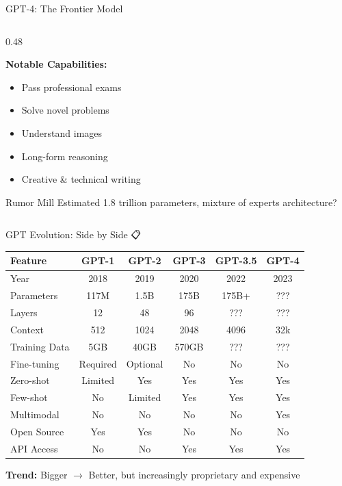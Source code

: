 \documentclass[aspectratio=169]{beamer}
\begin{document}
\begin{frame}{GPT-4: The Frontier Model 🔮}
\begin{columns}[T]
\begin{column}{0.48\textwidth}
\vspace{0.5em}

\textbf{Notable Capabilities:}
\begin{itemize}
    \item Pass professional exams
    \item Solve novel problems
    \item Understand images
    \item Long-form reasoning
    \item Creative \& technical writing
\end{itemize}

\vspace{0.5em}

\begin{alertblock}{Rumor Mill}
\scriptsize
Estimated 1.8 trillion parameters, mixture of experts architecture?
\end{alertblock}
\end{column}
\end{columns}
\end{frame}

\begin{frame}{GPT Evolution: Side by Side 📋}
\begin{center}
\small
\begin{tabular}{lccccc}
\toprule
\textbf{Feature} & \textbf{GPT-1} & \textbf{GPT-2} & \textbf{GPT-3} & \textbf{GPT-3.5} & \textbf{GPT-4} \\
\midrule
Year & 2018 & 2019 & 2020 & 2022 & 2023 \\
Parameters & 117M & 1.5B & 175B & 175B+ & ???\\
Layers & 12 & 48 & 96 & ??? & ??? \\
Context & 512 & 1024 & 2048 & 4096 & 32k \\
Training Data & 5GB & 40GB & 570GB & ??? & ??? \\
\midrule
Fine-tuning & Required & Optional & No & No & No \\
Zero-shot & Limited & Yes & Yes & Yes & Yes \\
Few-shot & No & Limited & Yes & Yes & Yes \\
Multimodal & No & No & No & No & \alert{Yes} \\
\midrule
Open Source & Yes & Yes & No & No & No \\
API Access & No & No & Yes & Yes & Yes \\
\bottomrule
\end{tabular}
\end{center}

\vspace{1em}

\textbf{Trend:} Bigger $\rightarrow$ Better, but increasingly \alert{proprietary} and \alert{expensive}
\end{frame}
\end{document}
